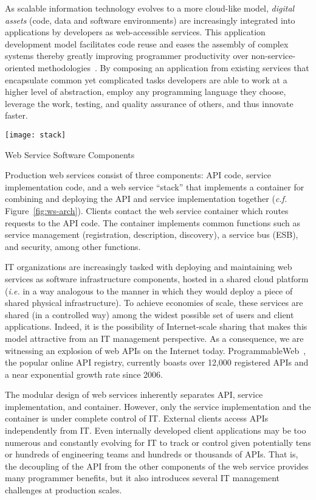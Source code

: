 As scalable information technology evolves to a more cloud-like model,
{\em digital assets} (code, data and software environments) 
are increasingly integrated into applications by developers 
as web-accessible services.
This application development model facilitates code reuse and eases the 
assembly of complex systems thereby greatly improving programmer productivity
over non-service-oriented methodologies~\cite{Dan:2008:SSR:1370916.1370923}. 
By composing an application from existing services that 
encapsulate common yet complicated tasks developers are able  
to work at a higher level of abstraction, employ any programming 
language they choose, leverage the work, testing, and quality
assurance of others, and thus innovate faster.  

\begin{floatingfigure}[rb]{2.8in}
\vspace{-0.1in}
\texttt{[image: stack]}
\vspace{-0.08in}
\caption{Web Service Software Components\label{fig:ws-arch}}
\end{floatingfigure}
Production web services consist of three components: API code, service
implementation code, and a web service ``stack'' that implements a container
for combining and deploying the API and service implementation
together ({\em c.f.} Figure~\ref{fig:ws-arch}).
Clients contact the web service container which routes requests to the
API code. The container implements common functions such as 
service management (registration, description, discovery), a service
bus (ESB), and security, among other 
functions.

IT organizations are increasingly tasked with deploying and 
maintaining web services as software infrastructure components, hosted in a
shared cloud platform ({\em i.e.} in a way analogous to the manner in which they
would deploy a piece of shared physical infrastructure).  
To achieve economies of scale, these services are shared (in a controlled
way) among the widest possible set of users and client applications.  Indeed,
it is the possibility of Internet-scale sharing that makes this model
attractive from an IT management perspective. As a consequence, we 
are witnessing an explosion of web APIs on the Internet today. ProgrammableWeb~\cite{pweb},
the popular online API registry, currently boasts over 12,000 registered APIs and
a near exponential growth rate since 2006.

The modular design of web services inherently separates API, 
service implementation, and container. However, only 
the service implementation and the container is under complete
control of IT. External clients access APIs independently from IT.
Even internally developed client applications may be too numerous and
constantly evolving for IT to track or control given
potentially tens or hundreds of engineering teams and hundreds or 
thousands of APIs.  That is, the decoupling of the API from the 
other components of the web service provides many programmer
benefits, but it also introduces several IT management challenges 
at production scales. 

